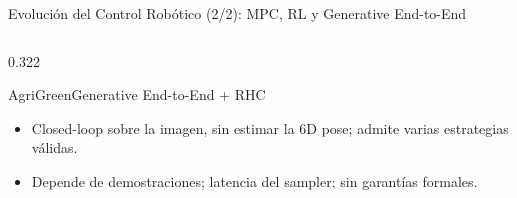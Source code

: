 \documentclass[aspectratio=169,10pt,xcolor={dvipsnames,table}]{beamer}
\newcommand{\FootnoteFont}{\fontsize{5}{6.2}\selectfont}                %
\newcommand{\CardHeightDouble}{42.5mm}     %
\newcommand{\CheckMark}{\textcolor{AgriGreen}{$\checkmark$}}
\newcommand{\CrossMark}{\textcolor{AlertRed}{$\times$}}
\newcommand{\RefNote}[1]{{\FootnoteFont\textcolor{TextDark!65}{\cite{#1}}}}
\begin{document}
\begin{frame}{Evolución del Control Robótico (2/2): MPC, RL y Generative End-to-End}
\begin{columns}[T, onlytextwidth]
\begin{column}{0.322\textwidth}
\begin{Card}[height=\CardHeightDouble]{AgriGreen}{Generative End-to-End + RHC}
{\begin{itemize}
          \item[\CheckMark] Closed-loop sobre la imagen, sin estimar la 6D pose; admite varias estrategias válidas.
          \item[\CrossMark] Depende de demostraciones; latencia del sampler; sin garantías formales.
        \end{itemize}
        \RefNote{chi2025diffusion,zhao2023act}}
      \end{Card}
    \end{column}
  \end{columns}
\end{frame}

\end{document}
